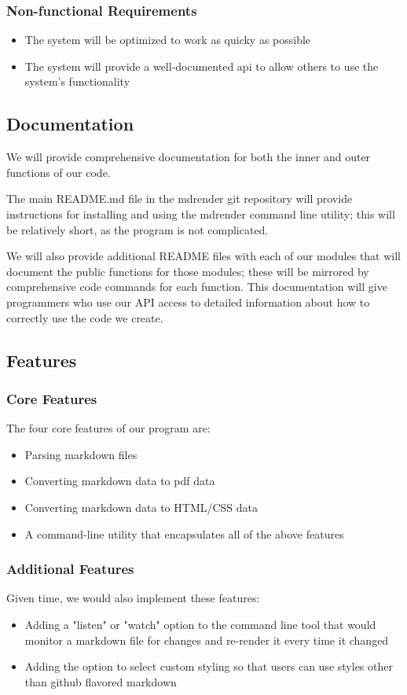 \subsubsection{Non-functional Requirements}
\begin{itemize}
	\item The system will be optimized to work as quicky as possible
	\item The system will provide a well-documented api to allow others to use the system's functionality
\end{itemize}

\subsection{Documentation}

We will provide comprehensive documentation for both the inner and outer functions of our code.

The main README.md file in the mdrender git repository will provide instructions for installing and using the mdrender command line utility; this will be relatively short, as the program is not complicated.

We will also provide additional README files with each of our modules that will document the public functions for those modules; these will be mirrored by comprehensive code commands for each function. This documentation will give programmers who use our API access to detailed information about how to correctly use the code we create.

\subsection{Features}

\subsubsection{Core Features}

The four core features of our program are:
\begin{itemize}
  \item Parsing markdown files
  \item Converting markdown data to pdf data
  \item Converting markdown data to HTML/CSS data
  \item A command-line utility that encapsulates all of the above features
\end{itemize}

\subsubsection{Additional Features}
Given time, we would also implement these features:
\begin{itemize}
  \item Adding a "listen" or "watch" option to the command line tool that would monitor a markdown file for changes and re-render it every time it changed
  \item Adding the option to select custom styling so that users can use styles other than github flavored markdown
\end{itemize}
